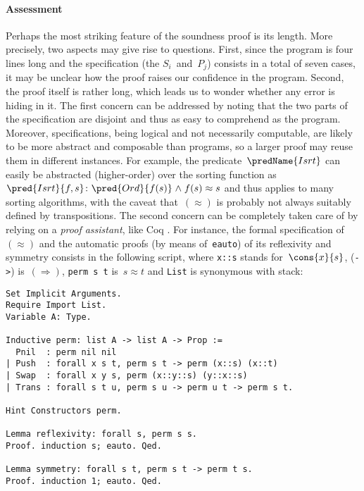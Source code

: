 \paragraph{Assessment}

Perhaps the most striking feature of the soundness proof is its
length. More precisely, two aspects may give rise to questions. First,
since the program is four lines long and the specification (the
\(S_i\)~and~\(P_j\)) consists in a total of seven cases, it may be
unclear how the proof raises our confidence in the program. Second,
the proof itself is rather long, which leads us to wonder whether any
error is hiding in it. The first concern can be addressed by noting
that the two parts of the specification are disjoint and thus as easy
to comprehend as the program. Moreover, specifications, being logical
and not necessarily computable, are likely to be more abstract and
composable than programs, so a larger proof may reuse them in
different instances. For example, the predicate~\(\predName{Isrt}\)
can easily be abstracted (higher\hyp{}order) over the sorting function
as \(\pred{Isrt}{f,s} \colon \pred{Ord}{f(s)} \mathrel{\wedge} f(s)
\approx s\) and
thus applies to many sorting algorithms, with the caveat
that~\((\approx)\) is probably not always suitably defined by
transpositions. The second concern can be completely taken care of by
relying on a \emph{proof assistant}, like
\textsf{Coq} \citep{BertotCasteran_2004}. For instance, the formal
specification of~\((\approx)\) and the automatic proofs (by means
of~\texttt{eauto}) of its reflexivity and symmetry consists in the
following script, where \verb|x::s| stands for~\(\cons{x}{s}\),
(\verb|->|) is~\((\Rightarrow)\), \verb|perm s t| is~\(s \approx t\)
and \verb|List| is synonymous with stack:
\begin{verbatim}
Set Implicit Arguments.
Require Import List.
Variable A: Type.

Inductive perm: list A -> list A -> Prop :=
  Pnil  : perm nil nil
| Push  : forall x s t, perm s t -> perm (x::s) (x::t)
| Swap  : forall x y s, perm (x::y::s) (y::x::s)
| Trans : forall s t u, perm s u -> perm u t -> perm s t.

Hint Constructors perm.

Lemma reflexivity: forall s, perm s s.
Proof. induction s; eauto. Qed.

Lemma symmetry: forall s t, perm s t -> perm t s.
Proof. induction 1; eauto. Qed.
\end{verbatim}

